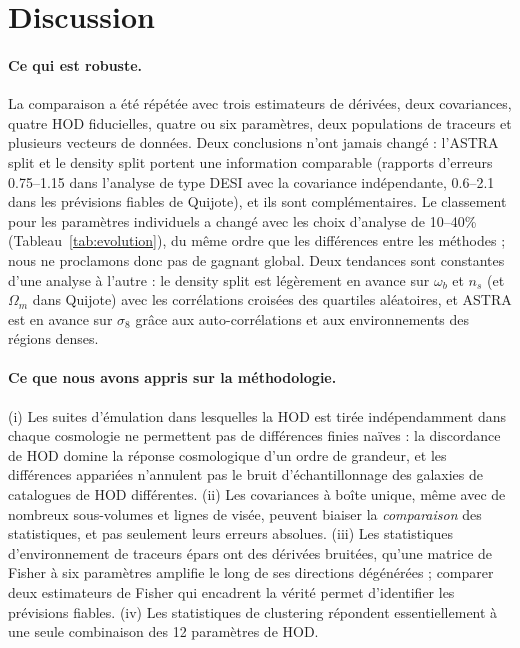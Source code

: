 \section{Discussion}
\label{sec:discussion}

\paragraph{Ce qui est robuste.} La comparaison a été répétée avec trois estimateurs de dérivées, deux covariances, quatre HOD fiducielles, quatre ou six paramètres, deux populations de traceurs et plusieurs vecteurs de données. Deux conclusions n'ont jamais changé : l'ASTRA split et le density split portent une information comparable (rapports d'erreurs 0.75--1.15 dans l'analyse de type DESI avec la covariance indépendante, 0.6--2.1 dans les prévisions fiables de Quijote), et ils sont complémentaires. Le classement pour les paramètres individuels a changé avec les choix d'analyse de 10--40\% (Tableau~\ref{tab:evolution}), du même ordre que les différences entre les méthodes ; nous ne proclamons donc pas de gagnant global. Deux tendances sont constantes d'une analyse à l'autre : le density split est légèrement en avance sur $\omega_b$ et $n_s$ (et $\Omega_m$ dans Quijote) avec les corrélations croisées des quartiles aléatoires, et ASTRA est en avance sur $\sigma_8$ grâce aux auto-corrélations et aux environnements des régions denses.

\paragraph{Ce que nous avons appris sur la méthodologie.} (i) Les suites d'émulation dans lesquelles la HOD est tirée indépendamment dans chaque cosmologie ne permettent pas de différences finies naïves : la discordance de HOD domine la réponse cosmologique d'un ordre de grandeur, et les différences appariées n'annulent pas le bruit d'échantillonnage des galaxies de catalogues de HOD différentes. (ii) Les covariances à boîte unique, même avec de nombreux sous-volumes et lignes de visée, peuvent biaiser la \emph{comparaison} des statistiques, et pas seulement leurs erreurs absolues. (iii) Les statistiques d'environnement de traceurs épars ont des dérivées bruitées, qu'une matrice de Fisher à six paramètres amplifie le long de ses directions dégénérées ; comparer deux estimateurs de Fisher qui encadrent la vérité permet d'identifier les prévisions fiables. (iv) Les statistiques de clustering répondent essentiellement à une seule combinaison des 12 paramètres de HOD.

